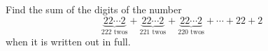Find the sum of the digits of the number
\[\underbrace{22\cdots2}_{222\text{ twos}}+\underbrace{22\cdots2}_{221\text{ twos}}+\underbrace{22\cdots2}_{220\text{ twos}}+\cdots+22+2\]
when it is written out in full.
